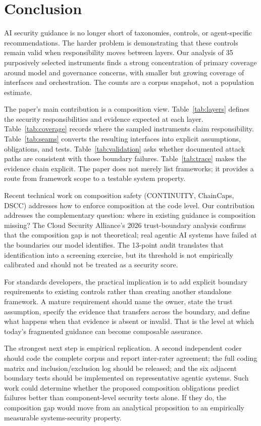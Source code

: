 \documentclass[runningheads]{llncs}
\begin{document}
\section{Conclusion}
AI security guidance is no longer short of taxonomies, controls, or agent-specific recommendations. The harder problem is demonstrating that these controls remain valid when responsibility moves between layers. Our analysis of 35 purposively selected instruments finds a strong concentration of primary coverage around model and governance concerns, with smaller but growing coverage of interfaces and orchestration. The counts are a corpus snapshot, not a population estimate.

The paper's main contribution is a composition view. Table~\ref{tab:layers} defines the security responsibilities and evidence expected at each layer. Table~\ref{tab:coverage} records where the sampled instruments claim responsibility. Table~\ref{tab:seams} converts the resulting interfaces into explicit assumptions, obligations, and tests. Table~\ref{tab:validation} asks whether documented attack paths are consistent with those boundary failures. Table~\ref{tab:trace} makes the evidence chain explicit. The paper does not merely list frameworks; it provides a route from framework scope to a testable system property.

Recent technical work on composition safety (CONTINUITY, ChainCaps, DSCC) addresses how to enforce composition at the code level. Our contribution addresses the complementary question: where in existing guidance is composition missing? The Cloud Security Alliance's 2026 trust-boundary analysis confirms that the composition gap is not theoretical; real agentic AI systems have failed at the boundaries our model identifies. The 13-point audit translates that identification into a screening exercise, but its threshold is not empirically calibrated and should not be treated as a security score.

For standards developers, the practical implication is to add explicit boundary requirements to existing controls rather than creating another standalone framework. A mature requirement should name the owner, state the trust assumption, specify the evidence that transfers across the boundary, and define what happens when that evidence is absent or invalid. That is the level at which today's fragmented guidance can become composable assurance.

The strongest next step is empirical replication. A second independent coder should code the complete corpus and report inter-rater agreement; the full coding matrix and inclusion/exclusion log should be released; and the six adjacent boundary tests should be implemented on representative agentic systems. Such work could determine whether the proposed composition obligations predict failures better than component-level security tests alone. If they do, the composition gap would move from an analytical proposition to an empirically measurable systems-security property.
\end{document}
